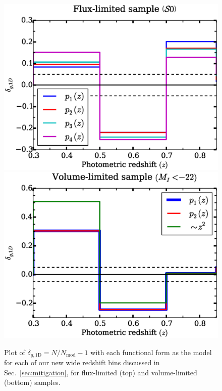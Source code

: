 \documentclass[twocolumn,useAMS,usenatbib]{mn2e}
\newcommand{\rachel}[1]{{\textcolor{red}{#1}}}
\newcommand{\arun}[1]{{\textcolor{blue}{#1}}}
\begin{document}
\begin{figure}
 \centering
 \includegraphics[width=1.0\columnwidth]{redshift_fluxlimited_wide}
 \includegraphics[width=1.0\columnwidth]{redshift_vollimited_wide}
 \caption{Plot of $\delta_{g,\text{1D}} =  N/N_{\text{mod}}-1$ with each functional form as the model
           for each of our new wide redshift bins discussed in Sec.~\ref{sec:mitigation}, for flux-limited (top) and
           volume-limited (bottom) samples.
          }
 \label{fig:redshift_wide}          
\end{figure}
\end{document}
